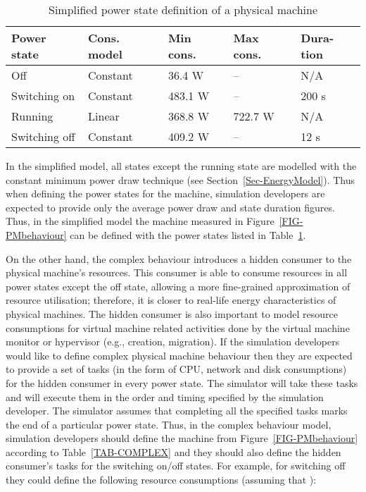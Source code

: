\documentclass[sort, compress, 5p]{elsarticle}
\begin{document}
\begin{table}[tb]
\centering
\caption{Simplified power state definition of a physical machine\label{TAB-SIMPLI}}
\begin{tabular}{p{2cm}p{1.2cm}p{1.3cm}p{1.3cm}p{0.9cm}}
Power state & Cons. model & Min cons. & Max cons. & Dura-tion \\
\hline
Off & Constant & 36.4 W & -- & N/A\\
Switching on & Constant &483.1 W & -- & 200 s\\
Running & Linear & 368.8 W & 722.7 W & N/A\\
Switching off & Constant & 409.2 W & -- & 12 s\\
\hline
\end{tabular}
\end{table}

In the simplified model, all states except the running state are modelled with the constant minimum power draw technique (see Section~\ref{Sec-EnergyModel}). Thus when defining the power states for the machine, simulation developers are expected to provide only the average power draw and state duration figures. Thus, in the simplified model the machine measured in Figure~\ref{FIG-PMbehaviour} can be defined with the power states listed in Table~\ref{TAB-SIMPLI}.

On the other hand, the complex behaviour introduces a hidden consumer to the physical machine's resources. This consumer is able to consume resources in all power states except the off state, allowing a more fine-grained approximation of resource utilisation; therefore, it is closer to real-life energy characteristics of physical machines. The hidden consumer is also important to model resource consumptions for virtual machine related activities done by the virtual machine monitor or hypervisor (e.g., creation, migration). If the simulation developers would like to define complex physical machine behaviour then they are expected to provide a set of tasks (in the form of CPU, network and disk consumptions) for the hidden consumer in every power state. The simulator will take these tasks and will execute them in the order and timing specified by the simulation developer. The simulator assumes that completing all the specified tasks marks the end of a particular power state. Thus, in the complex behaviour model, simulation developers should define the machine from Figure~\ref{FIG-PMbehaviour} according to Table~\ref{TAB-COMPLEX} and they should also define the hidden consumer's tasks for the switching on/off states. For example, for switching off they could define the following resource consumptions (assuming that ):
\end{document}
